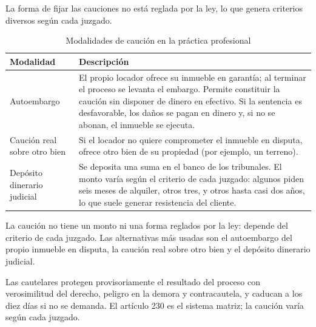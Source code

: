 \documentclass[12pt,oneside]{book}
\begin{document}
La forma de fijar las cauciones no está reglada por la ley, lo que genera criterios diversos según cada juzgado.

\begin{table}[H]
\centering
\caption{Modalidades de caución en la práctica profesional}
\begin{tabularx}{\textwidth}{>{\raggedright\arraybackslash}p{} X}
\toprule
\textbf{Modalidad} & \textbf{Descripción} \\
\midrule
Autoembargo & El propio locador ofrece su inmueble en garantía; al terminar el proceso se levanta el embargo. Permite constituir la caución sin disponer de dinero en efectivo. Si la sentencia es desfavorable, los daños se pagan en dinero y, si no se abonan, el inmueble se ejecuta. \\
Caución real sobre otro bien & Si el locador no quiere comprometer el inmueble en disputa, ofrece otro bien de su propiedad (por ejemplo, un terreno). \\
Depósito dinerario judicial & Se deposita una suma en el banco de los tribunales. El monto varía según el criterio de cada juzgado: algunos piden seis meses de alquiler, otros tres, y otros hasta casi dos años, lo que suele generar resistencia del cliente. \\
\bottomrule
\end{tabularx}
\end{table}

\begin{important}
La caución no tiene un monto ni una forma reglados por la ley: depende del criterio de cada juzgado. Las alternativas más usadas son el autoembargo del propio inmueble en disputa, la caución real sobre otro bien y el depósito dinerario judicial.
\end{important}

\begin{sintesis}
Las cautelares protegen provisoriamente el resultado del proceso con verosimilitud del derecho, peligro en la demora y contracautela, y caducan a los diez días si no se demanda. El artículo 230 es el sistema matriz; la caución varía según cada juzgado.
\end{sintesis}
\end{document}
